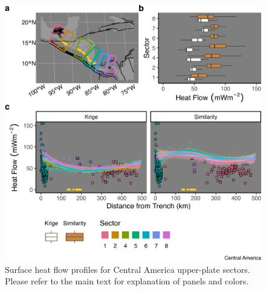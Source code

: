 \begin{figure}[htbp]

{\centering \includegraphics[width=1\linewidth,]{assets/figs/chpt3/CentralAmericaUpperPlate} 

}

\caption[Surface heat flow profiles for Central America upper-plate sectors]{Surface heat flow profiles for Central America upper-plate sectors. Please refer to the main text for explanation of panels and colors.}\label{fig:centralAmericaUpper}
\end{figure}

